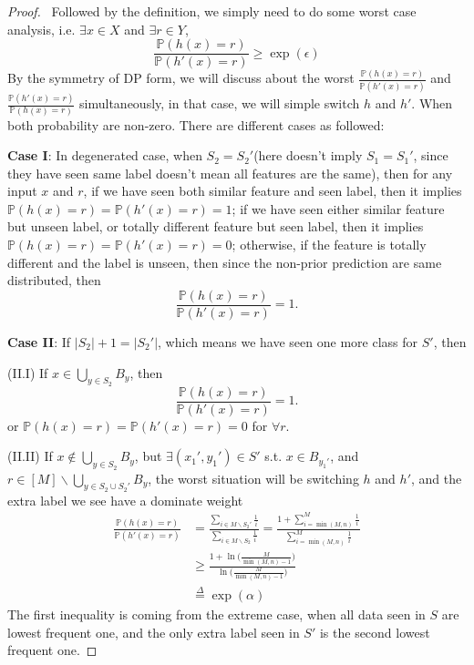 \documentclass[12pt]{article}
\numberwithin{theorem}{section} %
\numberwithin{definition}{section} %
\numberwithin{assumption}{section} %
\numberwithin{lemma}{section} %
\numberwithin{remark}{section} %
\numberwithin{prop}{section} %
\numberwithin{corollary}{section} %
\numberwithin{example}{section} %
\numberwithin{question}{section} %
\numberwithin{problem}{section} %
\numberwithin{conjecture}{section} %
\numberwithin{append}{section} %
\numberwithin{property}{section} %
\def\P{{\mathbb P}}     %
\begin{document}
	
	
	\begin{proof}\
	Followed by the definition, we simply need to do some worst case analysis, i.e. $\exists x\in X$ and $\exists r\in Y$,
	\begin{equation}
		\frac{\P(h(x)=r)}{\P(h'(x)=r)} \ge \exp(\epsilon)
	\end{equation}
	By the symmetry of DP form, we will discuss about the worst $\frac{\P(h(x)=r)}{\P(h'(x)=r)}$ and $\frac{\P(h'(x)=r)}{\P(h(x)=r)}$ simultaneously, in that case, we will simple switch $h$ and $h'$. When both probability are non-zero. There are different cases as followed:
		
	\noindent \textbf{Case I}:
	In degenerated case, when $S_2=S_2'$(here doesn't imply $S_1=S_1'$, since they have seen same label doesn't mean all features are the same), then for any input $x$ and $r$, if we have seen both similar feature and seen label, then it implies $\P(h(x)=r)=\P(h'(x)=r)=1$; if we have seen either similar feature but  unseen label, or totally different feature but seen label, then it implies $\P(h(x)=r)=\P(h'(x)=r)=0$; otherwise, if the feature is totally different and the label is unseen, then since the non-prior prediction are same distributed, then 	\
	\begin{equation}
		\frac{\P(h(x)=r)}{\P(h'(x)=r)}=1.
	\end{equation}
	\vspace{0.2in}
	
	\noindent \textbf{Case II}: If $|S_2|+1=|S_2'|$, which means we have seen one more class for $S'$, then 

	\noindent (II.I) If $x\in \bigcup\limits_{y\in S_2} B_y$, then 
	\begin{equation}
		\frac{\P(h(x)=r)}{\P(h'(x)=r)}=1.
	\end{equation}
	or $\P(h(x)=r)=\P(h'(x)=r)=0$ for $\forall r$.
	
	\noindent (II.II) If $x\notin \bigcup\limits_{y\in S_2} B_y$, but $\exists (x_1',y_1')\in S'$ s.t. $x\in B_{y_1'}$, and $r\in[M]\backslash\bigcup\limits_{y\in S_2\cup S_2'} B_y$, the worst situation will be switching $h$ and $h'$, and the extra label we see have a dominate weight 
	\begin{equation}
		\begin{aligned}
			\frac{\P(h(x)=r)}{\P(h'(x)=r)}& = \frac{\sum\limits_{i\in M\backslash S_2'} \frac{1}{i}}{\sum\limits_{i\in M\backslash S_2} \frac{1}{i}} = \frac{1+\sum\limits_{i=\min(M,n)}^{M} \frac{1}{i}}{\sum\limits_{i=\min(M,n)}^{M} \frac{1}{i}}\\
			&\ge \frac{1+\ln \big(\frac{M}{\min(M,n)-1}\big)}{\ln \big(\frac{M}{\min(M,n)-1}\big)} \\
			&\overset{\Delta}{=} \exp(\alpha)
		\end{aligned}
	\end{equation}
The first inequality is coming from the extreme case, when all data seen in $S$ are lowest frequent one, and the only extra label seen in $S'$ is the second lowest frequent one. 


\end{proof}
\end{document}
